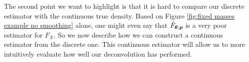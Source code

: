 	The second point we want to highlight is that it is hard to compare our discrete estimator with the continuous true density. Based on Figure \ref{fig:fixed masses example no smoothing} alone, one might even say that $\hat{F}_{{\bm{{\theta}}},{\bm{{p}}}}$ is a very poor estimator for $F_X$. So we now describe how we can construct a continuous estimator from the discrete one. This continuous estimator will allow us to more intuitively evaluate how well our deconvolution has performed.



